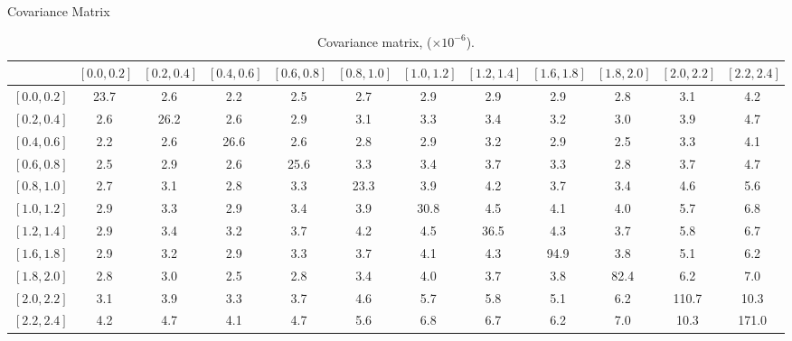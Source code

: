 \documentclass[8pt]{beamer}
\begin{document}
\renewcommand\tabcolsep{0pt}
\renewcommand\arraystretch{1.6}
\begin{frame}{Covariance Matrix}
  \tiny{
  \begin{center}
    \begin{table}
    \begin{tabular}{l|ccccccccccc}
& \tiny{$\left[0.0,0.2\right]$}
& \tiny{$\left[0.2,0.4\right]$}
& \tiny{$\left[0.4,0.6\right]$} 
& \tiny{$\left[0.6,0.8\right]$}   
& \tiny{$\left[0.8,1.0\right]$}
& \tiny{$\left[1.0,1.2\right]$} 
& \tiny{$\left[1.2,1.4\right]$}
& \tiny{$\left[1.6,1.8\right]$}
& \tiny{$\left[1.8,2.0\right]$} 
& \tiny{$\left[2.0,2.2\right]$} 
& \tiny{$\left[2.2,2.4\right]$} \\ \hline
\tiny{$\left[0.0,0.2\right]$} & \alert{23.7} & 2.6 & 2.2 & 2.5 & 2.7 & 2.9 & 2.9 & 2.9 & 2.8 & 3.1 & 4.2 \\
\tiny{$\left[0.2,0.4\right]$} & 2.6 & \alert{26.2} & 2.6 & 2.9 & 3.1 & 3.3 & 3.4 & 3.2 & 3.0 & 3.9 & 4.7 \\
\tiny{$\left[0.4,0.6\right]$} & 2.2 & 2.6 & \alert{26.6} & 2.6 & 2.8 & 2.9 & 3.2 & 2.9 & 2.5 & 3.3 & 4.1 \\
\tiny{$\left[0.6,0.8\right]$} & 2.5 & 2.9 & 2.6 & \alert{25.6} & 3.3 & 3.4 & 3.7 & 3.3 & 2.8 & 3.7 & 4.7 \\
\tiny{$\left[0.8,1.0\right]$} & 2.7 & 3.1 & 2.8 & 3.3 & \alert{23.3} & 3.9 & 4.2 & 3.7 & 3.4 & 4.6 & 5.6 \\
\tiny{$\left[1.0,1.2\right]$} & 2.9 & 3.3 & 2.9 & 3.4 & 3.9 & \alert{30.8} & 4.5 & 4.1 & 4.0 & 5.7 & 6.8 \\
\tiny{$\left[1.2,1.4\right]$} & 2.9 & 3.4 & 3.2 & 3.7 & 4.2 & 4.5 & \alert{36.5} & 4.3 & 3.7 & 5.8 & 6.7 \\
\tiny{$\left[1.6,1.8\right]$} & 2.9 & 3.2 & 2.9 & 3.3 & 3.7 & 4.1 & 4.3 & \alert{94.9} & 3.8 & 5.1 & 6.2 \\
\tiny{$\left[1.8,2.0\right]$} & 2.8 & 3.0 & 2.5 & 2.8 & 3.4 & 4.0 & 3.7 & 3.8 & \alert{82.4} & 6.2 & 7.0 \\ 
\tiny{$\left[2.0,2.2\right]$} & 3.1 & 3.9 & 3.3 & 3.7 & 4.6 & 5.7 & 5.8 & 5.1 & 6.2 & \alert{110.7} & 10.3 \\
\tiny{$\left[2.2,2.4\right]$} & 4.2 & 4.7 & 4.1 & 4.7 & 5.6 & 6.8 & 6.7 & 6.2 & 7.0 & 10.3 & \alert{171.0} \\
    \end{tabular}
    \caption{Covariance matrix, ($\times 10^{-6}$).  }
    \end{table}
  \end{center}
  }
\end{frame}
\renewcommand\tabcolsep{6pt}
\renewcommand\arraystretch{1.}
\end{document}
